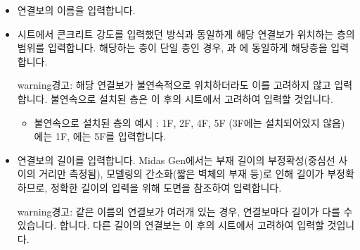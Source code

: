 \documentclass[a4paper,11pt,korean,openany,oneside]{sphinxmanual}
\begin{document}
\begin{itemize}
\item {} \begin{description}
\sphinxAtStartPar
연결보의 이름을 입력합니다.

\end{description}

\item {} \begin{description}
\sphinxAtStartPar
{\hyperref[\detokenize{2_etc::doc}]{}} 시트에서 콘크리트 강도를 입력했던 방식과 동일하게 해당 연결보가 위치하는 층의 범위를 입력합니다.
해당하는 층이 단일 층인 경우, 과 에 동일하게 해당층을 입력합니다.

\begin{sphinxadmonition}{warning}{경고:}
\sphinxAtStartPar
해당 연결보가 불연속적으로 위치하더라도 이를 고려하지 않고 입력합니다.
불연속으로 설치된 층은 이 후의 시트에서 고려하여 입력할 것입니다.
\begin{itemize}
\item {} 
\sphinxAtStartPar
불연속으로 설치된 층의 예시 : 1F, 2F, 4F, 5F (3F에는 설치되어있지 않음)
에는 1F, 에는 5F를 입력합니다.

\end{itemize}
\end{sphinxadmonition}

\end{description}

\item {} \begin{description}
\sphinxAtStartPar
연결보의 길이를 입력합니다.
Midas Gen에서는 부재 길이의 부정확성(중심선 사이의 거리만 측정됨),
모델링의 간소화(짧은 벽체의 부재 등)로 인해 길이가 부정확하므로,
정확한 길이의 입력을 위해 도면을 참조하여 입력합니다.

\begin{sphinxadmonition}{warning}{경고:}
\sphinxAtStartPar
같은 이름의 연결보가 여러개 있는 경우, 연결보마다 길이가 다를 수 있습니다.
합니다.
다른 길이의 연결보는 이 후의 시트에서 고려하여 입력할 것입니다.
\end{sphinxadmonition}


\end{description}
\end{itemize}
\end{document}
